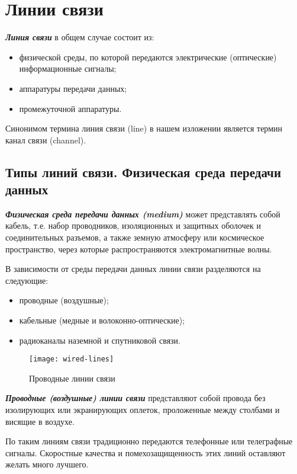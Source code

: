 \chapter{Линии связи}

\textbf{\textit{Линия связи}} в общем случае состоит из:
\begin{itemize}
    \item физической среды, по которой передаются электрические (оптические) информационные сигналы;
    \item аппаратуры передачи данных;
    \item промежуточной аппаратуры.
\end{itemize}

Синонимом термина линия связи (line) в нашем изложении является термин канал связи (channel).

\section{Типы линий связи. Физическая среда передачи данных}

\textbf{\textit{Физическая среда передачи данных (medium)}} может представлять собой кабель, т.е. набор проводников, изоляционных и защитных оболочек и соединительных разъемов, а также земную атмосферу или космическое пространство, через которые распространяются электромагнитные волны.

В зависимости от среды передачи данных линии связи разделяются на следующие:
\begin{itemize}
    \item проводные (воздушные);
    \item кабельные (медные и волоконно-оптические);
    \item радиоканалы наземной и спутниковой связи.
\end{itemize}

\begin{figure}
    \centering
    \texttt{[image: wired-lines]}
    \caption{Проводные линии связи}
    \label{fig:wired-lines}
\end{figure}

\textbf{\textit{Проводные (воздушные) линии связи}} представляют собой провода без изолирующих или экранирующих оплеток, проложенные между столбами и висящие в воздухе.

По таким линиям связи традиционно передаются телефонные или телеграфные сигналы.
Скоростные качества и помехозащищенность этих линий оставляют желать много лучшего.

